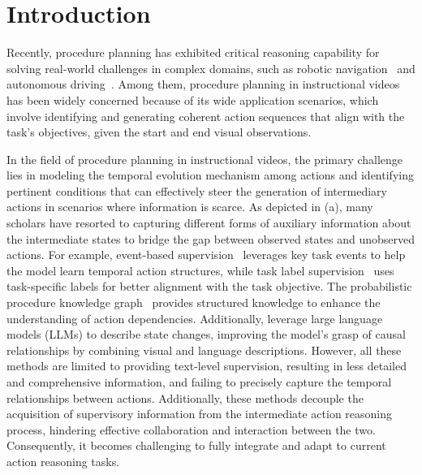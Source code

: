 \section{Introduction}

Recently, procedure planning has exhibited critical reasoning capability for solving real-world challenges in complex domains, such as robotic navigation~\citep{sermanet2024robovqa,bhaskara2024trajectory} and autonomous driving~\citep{wang2024driving,liao2024bat}. 
Among them, procedure planning in instructional videos~\citep{zhao2022p3iv,wang2023pdpp,li2023skip} has been widely concerned because of its wide application scenarios, which involve identifying and generating coherent action sequences that align with the task's objectives, given the start and end visual observations.

In the field of procedure planning in instructional videos, the primary challenge lies in modeling the temporal evolution mechanism among actions and identifying pertinent conditions that can effectively steer the generation of intermediary actions in scenarios where information is scarce. 
As depicted in (a), many scholars have resorted to capturing different forms of auxiliary information about the intermediate states to bridge the gap between observed states and unobserved actions. 
For example, event-based supervision~\citep{wang2023event} leverages key task events to help the model learn temporal action structures, while task label supervision~\citep{wang2023pdpp} uses task-specific labels for better alignment with the task objective. The probabilistic procedure knowledge graph~\citep{nagasinghe2024not} provides structured knowledge to enhance the understanding of action dependencies. Additionally, \citet{niu2024schema} leverage large language models (LLMs) to describe state changes, improving the model’s grasp of causal relationships by combining visual and language descriptions.
However, all these methods are limited to providing text-level supervision, resulting in less detailed and comprehensive information, and failing to precisely capture the temporal relationships between actions. 
Additionally, these methods decouple the acquisition of supervisory information from the intermediate action reasoning process, hindering effective collaboration and interaction between the two. Consequently, it becomes challenging to fully integrate and adapt to current action reasoning tasks. 

